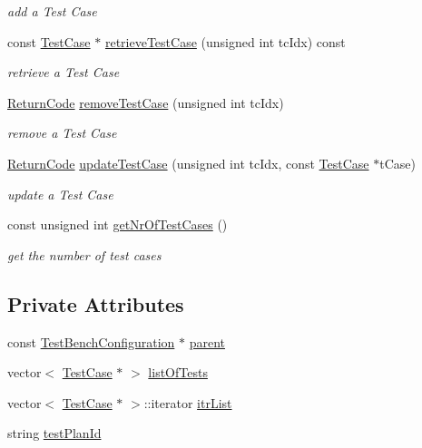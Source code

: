 \begin{DoxyCompactItemize}
\begin{DoxyCompactList}\small\item\em add a Test Case \end{DoxyCompactList}\item 
const \hyperlink{classit_1_1testbench_1_1data_1_1TestCase}{Test\-Case} $\ast$ \hyperlink{classit_1_1testbench_1_1data_1_1TestPlan_abf04bf012b35a099b0815a7fa28b4477}{retrieve\-Test\-Case} (unsigned int tc\-Idx) const 
\begin{DoxyCompactList}\small\item\em retrieve a Test Case \end{DoxyCompactList}\item 
\hyperlink{structit_1_1testbench_1_1data_1_1ReturnCode}{Return\-Code} \hyperlink{classit_1_1testbench_1_1data_1_1TestPlan_a31d4b0d2f023f08201ec38607785e243}{remove\-Test\-Case} (unsigned int tc\-Idx)
\begin{DoxyCompactList}\small\item\em remove a Test Case \end{DoxyCompactList}\item 
\hyperlink{structit_1_1testbench_1_1data_1_1ReturnCode}{Return\-Code} \hyperlink{classit_1_1testbench_1_1data_1_1TestPlan_a4e507335d0a606def0bac51f1daf26f1}{update\-Test\-Case} (unsigned int tc\-Idx, const \hyperlink{classit_1_1testbench_1_1data_1_1TestCase}{Test\-Case} $\ast$t\-Case)
\begin{DoxyCompactList}\small\item\em update a Test Case \end{DoxyCompactList}\item 
const unsigned int \hyperlink{classit_1_1testbench_1_1data_1_1TestPlan_af2012ac37c9834ea0128856b1a28c5fd}{get\-Nr\-Of\-Test\-Cases} ()
\begin{DoxyCompactList}\small\item\em get the number of test cases \end{DoxyCompactList}\end{DoxyCompactItemize}
\subsection*{Private Attributes}
\begin{DoxyCompactItemize}
\item 
const \hyperlink{classit_1_1testbench_1_1data_1_1TestBenchConfiguration}{Test\-Bench\-Configuration} $\ast$ \hyperlink{classit_1_1testbench_1_1data_1_1TestPlan_a79f502dcaa5c97db247d81c4808da43d}{parent}
\item 
vector$<$ \hyperlink{classit_1_1testbench_1_1data_1_1TestCase}{Test\-Case} $\ast$ $>$ \hyperlink{classit_1_1testbench_1_1data_1_1TestPlan_a83df4e37302bb57f0edd2f48caeeb1a9}{list\-Of\-Tests}
\item 
vector$<$ \hyperlink{classit_1_1testbench_1_1data_1_1TestCase}{Test\-Case} $\ast$ $>$\-::iterator \hyperlink{classit_1_1testbench_1_1data_1_1TestPlan_aa1e35baeb0392f101d2553319dcc12cf}{itr\-List}
\item 
string \hyperlink{classit_1_1testbench_1_1data_1_1TestPlan_aafc66e80e83fa15da6a4b725f8008667}{test\-Plan\-Id}
\end{DoxyCompactItemize}



